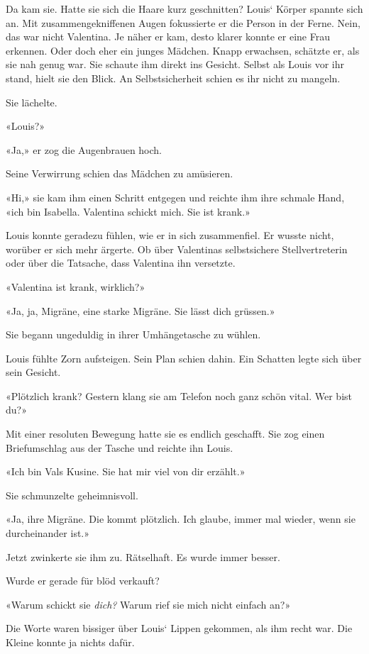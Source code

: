 Da kam sie. Hatte sie sich die Haare kurz geschnitten? Louis` Körper
spannte sich an. Mit zusammengekniffenen Augen fokussierte er die Person
in der Ferne. Nein, das war nicht Valentina. Je näher er kam, desto
klarer konnte er eine Frau erkennen. Oder doch eher ein junges Mädchen.
Knapp erwachsen, schätzte er, als sie nah genug war. Sie schaute ihm
direkt ins Gesicht. Selbst als Louis vor ihr stand, hielt sie den Blick.
An Selbstsicherheit schien es ihr nicht zu mangeln.

Sie lächelte.

«Louis?»

«Ja,» er zog die Augenbrauen hoch.

Seine Verwirrung schien das Mädchen zu amüsieren.

«Hi,» sie kam ihm einen Schritt entgegen und reichte ihm ihre schmale
Hand, «ich bin Isabella. Valentina schickt mich. Sie ist krank.»

Louis konnte geradezu fühlen, wie er in sich zusammenfiel. Er wusste
nicht, worüber er sich mehr ärgerte. Ob über Valentinas selbstsichere
Stellvertreterin oder über die Tatsache, dass Valentina ihn versetzte.

«Valentina ist krank, wirklich?»

«Ja, ja, Migräne, eine starke Migräne. Sie lässt dich grüssen.»

Sie begann ungeduldig in ihrer Umhängetasche zu wühlen.

Louis fühlte Zorn aufsteigen. Sein Plan schien dahin. Ein Schatten legte
sich über sein Gesicht.

«Plötzlich krank? Gestern klang sie am Telefon noch ganz schön vital.
Wer bist du?»

Mit einer resoluten Bewegung hatte sie es endlich geschafft. Sie zog
einen Briefumschlag aus der Tasche und reichte ihn Louis.

«Ich bin Vals Kusine. Sie hat mir viel von dir erzählt.»

Sie schmunzelte geheimnisvoll.

«Ja, ihre Migräne. Die kommt plötzlich. Ich glaube, immer mal wieder,
wenn sie durcheinander ist.»

Jetzt zwinkerte sie ihm zu. Rätselhaft. Es wurde immer besser.

Wurde er gerade für blöd verkauft?

«Warum schickt sie \emph{dich?} Warum rief sie mich nicht einfach an?»

Die Worte waren bissiger über Louis` Lippen gekommen, als ihm recht war.
Die Kleine konnte ja nichts dafür.

